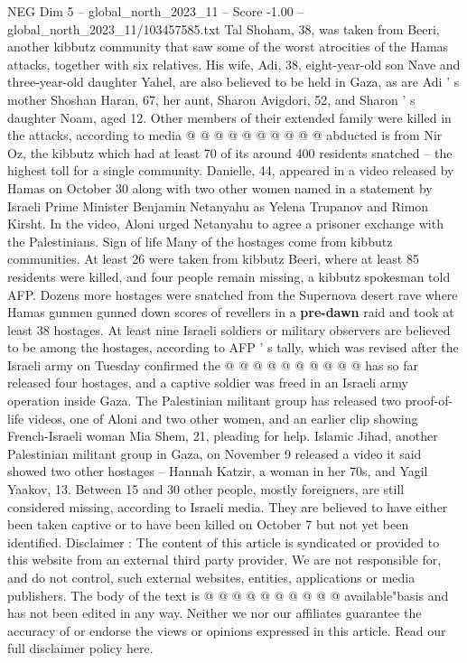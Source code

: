 \begin{textsample}{NEG Dim 5 – global\_north\_2023\_11 – Score -1.00 – global\_north\_2023\_11/103457585.txt}
Tal Shoham, 38, was taken from Beeri, another kibbutz community that saw some of the worst atrocities of the Hamas attacks, together with six relatives.
His wife, Adi, 38, eight-year-old son Nave and three-year-old daughter Yahel, are also believed to be held in Gaza, as are Adi ' s mother Shoshan Haran, 67, her aunt, Sharon Avigdori, 52, and Sharon ' s daughter Noam, aged 12.
Other members of their extended family were killed in the attacks, according to media @ @ @ @ @ @ @ @ @ @ abducted is from Nir Oz, the kibbutz which had at least 70 of its around 400 residents snatched -- the highest toll for a single community.
Danielle, 44, appeared in a video released by Hamas on October 30 along with two other women named in a statement by Israeli Prime Minister Benjamin Netanyahu as Yelena Trupanov and Rimon Kirsht.
In the video, Aloni urged Netanyahu to agree a prisoner exchange with the Palestinians.
Sign of life Many of the hostages come from kibbutz communities.
At least 26 were taken from kibbutz Beeri, where at least 85 residents were killed, and four people remain missing, a kibbutz spokesman told AFP.
Dozens more hostages were snatched from the Supernova desert rave where Hamas gunmen gunned down scores of revellers in a \textbf{pre-dawn} raid and took at least 38 hostages.
At least nine Israeli soldiers or military observers are believed to be among the hostages, according to AFP ' s tally, which was revised after the Israeli army on Tuesday confirmed the @ @ @ @ @ @ @ @ @ @ has so far released four hostages, and a captive soldier was freed in an Israeli army operation inside Gaza.
The Palestinian militant group has released two proof-of-life videos, one of Aloni and two other women, and an earlier clip showing French-Israeli woman Mia Shem, 21, pleading for help.
Islamic Jihad, another Palestinian militant group in Gaza, on November 9 released a video it said showed two other hostages -- Hannah Katzir, a woman in her 70s, and Yagil Yaakov, 13.
Between 15 and 30 other people, mostly foreigners, are still considered missing, according to Israeli media.
They are believed to have either been taken captive or to have been killed on October 7 but not yet been identified.
Disclaimer : The content of this article is syndicated or provided to this website from an external third party provider.
We are not responsible for, and do not control, such external websites, entities, applications or media publishers.
The body of the text is @ @ @ @ @ @ @ @ @ @ available"basis and has not been edited in any way.
Neither we nor our affiliates guarantee the accuracy of or endorse the views or opinions expressed in this article.
Read our full disclaimer policy here.

\end{textsample}
